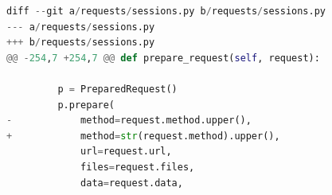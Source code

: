 \lstset{linewidth=\linewidth}
\lstset{basicstyle=\small\ttfamily}

\begin{lstlisting}[language=Python]
diff --git a/requests/sessions.py b/requests/sessions.py
--- a/requests/sessions.py
+++ b/requests/sessions.py
@@ -254,7 +254,7 @@ def prepare_request(self, request):
 
         p = PreparedRequest()
         p.prepare(
-            method=request.method.upper(),
+            method=str(request.method).upper(),
             url=request.url,
             files=request.files,
             data=request.data,
\end{lstlisting}